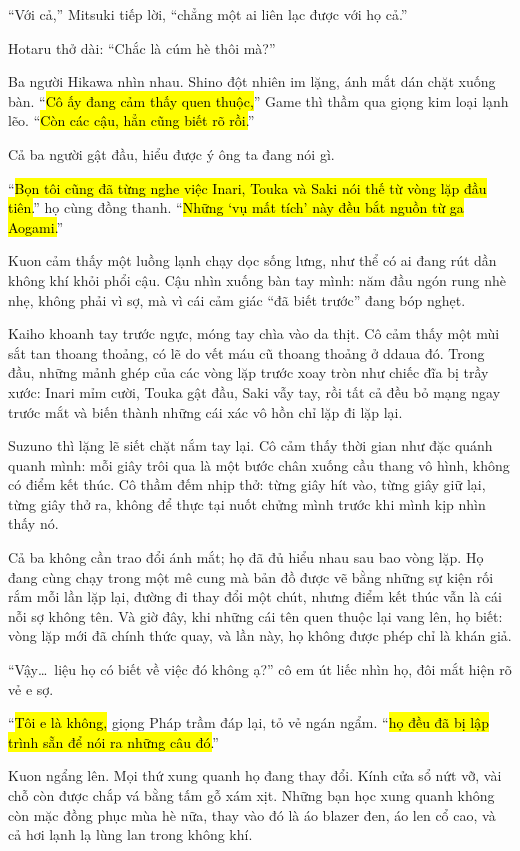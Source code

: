 \documentclass[../main.tex]{subfiles}
\begin{document}
``Với cả,'' Mitsuki tiếp lời, ``chẳng một ai liên lạc được với họ cả.''

Hotaru thở dài: ``Chắc là cúm hè thôi mà?''

Ba người Hikawa nhìn nhau. Shino đột nhiên im lặng, ánh mắt dán chặt xuống bàn. ``\hl{Cô ấy đang cảm thấy quen thuộc,}'' Game thì thầm qua giọng kim loại lạnh lẽo. ``\hl{Còn các cậu, hẳn cũng biết rõ rồi.}''

Cả ba người gật đầu, hiểu được ý ông ta đang nói gì.

``\hl{Bọn tôi cũng đã từng nghe việc Inari, Touka và Saki nói thế từ vòng lặp đầu tiên.}'' họ cùng đồng thanh. ``\hl{Những `vụ mất tích' này đều bắt nguồn từ ga Aogami.}''

Kuon cảm thấy một luồng lạnh chạy dọc sống lưng, như thể có ai đang rút dần không khí khỏi phổi cậu. Cậu nhìn xuống bàn tay mình: năm đầu ngón rung nhè nhẹ, không phải vì sợ, mà vì cái cảm giác ``đã biết trước'' đang bóp nghẹt.

Kaiho khoanh tay trước ngực, móng tay chìa vào da thịt. Cô cảm thấy một mùi sắt tan thoang thoảng, có lẽ do vết máu cũ thoang thoảng ở ddaua đó. Trong đầu, những mảnh ghép của các vòng lặp trước xoay tròn như chiếc đĩa bị trầy xước: Inari mỉm cười, Touka gật đầu, Saki vẫy tay, rồi tất cả đều bỏ mạng ngay trước mắt và biến thành những cái xác vô hồn chỉ lặp đi lặp lại.

Suzuno thì lặng lẽ siết chặt nắm tay lại. Cô cảm thấy thời gian như đặc quánh quanh mình: mỗi giây trôi qua là một bước chân xuống cầu thang vô hình, không có điểm kết thúc. Cô thầm đếm nhịp thở: từng giây hít vào, từng giây giữ lại, từng giây thở ra, không để thực tại nuốt chửng mình trước khi mình kịp nhìn thấy nó.

Cả ba không cần trao đổi ánh mắt; họ đã đủ hiểu nhau sau bao vòng lặp. Họ đang cùng chạy trong một mê cung mà bản đồ được vẽ bằng những sự kiện rối rắm mỗi lần lặp lại, đường đi thay đổi một chút, nhưng điểm kết thúc vẫn là cái nỗi sợ không tên. Và giờ đây, khi những cái tên quen thuộc lại vang lên, họ biết: vòng lặp mới đã chính thức quay, và lần này, họ không được phép chỉ là khán giả.

``Vậy\dots\ liệu họ có biết về việc đó không ạ?'' cô em út liếc nhìn họ, đôi mắt hiện rõ vẻ e sợ.

``\hl{Tôi e là không,} giọng Pháp trầm đáp lại, tỏ vẻ ngán ngẩm. ``\hl{họ đều đã bị lập trình sẵn để nói ra những câu đó.}''

Kuon ngẩng lên. Mọi thứ xung quanh họ đang thay đổi. Kính cửa sổ nứt vỡ, vài chỗ còn được chắp vá bằng tấm gỗ xám xịt. Những bạn học xung quanh không còn mặc đồng phục mùa hè nữa, thay vào đó là áo blazer đen, áo len cổ cao, và cả hơi lạnh lạ lùng lan trong không khí.
\end{document}
